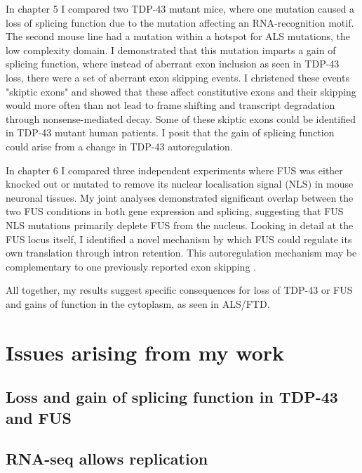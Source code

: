 In chapter 5 I compared two TDP-43 mutant mice, where one mutation caused a loss of splicing function due to the mutation affecting an RNA-recognition motif. 
The second mouse line had a mutation within a hotspot for ALS mutations, the low complexity domain.
I demonstrated that this mutation imparts a gain of splicing function, where instead of aberrant exon inclusion as seen in TDP-43 loss, there were a set of aberrant exon skipping events.
I christened these events "skiptic exons" and showed that these affect constitutive exons and their skipping would more often than not lead to frame shifting and transcript degradation through nonsense-mediated decay. 
Some of these skiptic exons could be identified in TDP-43 mutant human patients.
I posit that the gain of splicing function could arise from a change in TDP-43 autoregulation.

In chapter 6 I compared three independent experiments where FUS was either knocked out or mutated to remove its nuclear localisation signal (NLS) in mouse neuronal tissues.
My joint analyses demonstrated significant overlap between the two FUS conditions in both gene expression and splicing, suggesting that FUS NLS mutations primarily deplete FUS from the nucleus.
Looking in detail at the FUS locus itself, I identified a novel mechanism by which FUS could regulate its own translation through intron retention. 
This autoregulation mechanism may be complementary to one previously reported exon skipping \citep{Zhou2013}.

All together, my results suggest specific consequences for loss of TDP-43 or FUS and gains of function in the cytoplasm, as seen in ALS/FTD.

\section{Issues arising from my work}

\subsection{Loss and gain of splicing function in TDP-43 and FUS}



\subsection{RNA-seq allows replication }

